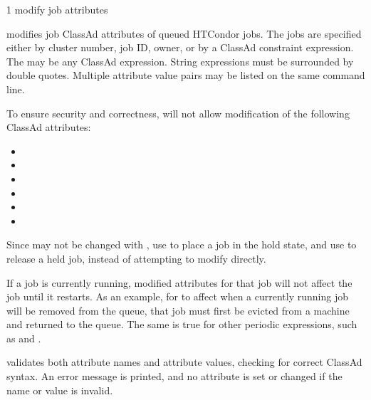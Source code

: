\begin{ManPage}{\label{man-condor-qedit}}{1}
{modify job attributes}

\Synopsis {}
\ToolDebugOption
{}
\Arg{\Dots}

\Description

 modifies job ClassAd attributes of queued HTCondor jobs.
The jobs are specified either by cluster number, job ID,
owner, or by a ClassAd constraint expression.
The  may be any ClassAd expression.
String expressions must be surrounded by double quotes.
Multiple attribute value pairs may be listed on the same
command line.

To ensure security and correctness,
 will not allow modification of the following
ClassAd attributes:
\begin{itemize}
\item {}
\item {}
\item {}
\item {}
\item {}
\item {}
\end{itemize}

Since  may not be changed with ,
use  to place a job in the hold state,
and use  to release a held job,
instead of attempting to modify  directly.

If a job is currently running, modified attributes for that job will not 
affect the job until it restarts.
As an example, for
 to affect when a currently running job will be
removed from the queue, 
that job must first be evicted from a machine and returned to the queue.
The same is true for other periodic expressions, 
such as  and .

 validates both attribute names and attribute values,
checking for correct ClassAd syntax.
An error message is printed, 
and no attribute is set or changed if the name or value is invalid.

\begin{Options}
    \ToolDebugDesc
\end{Options}


\end{ManPage}

